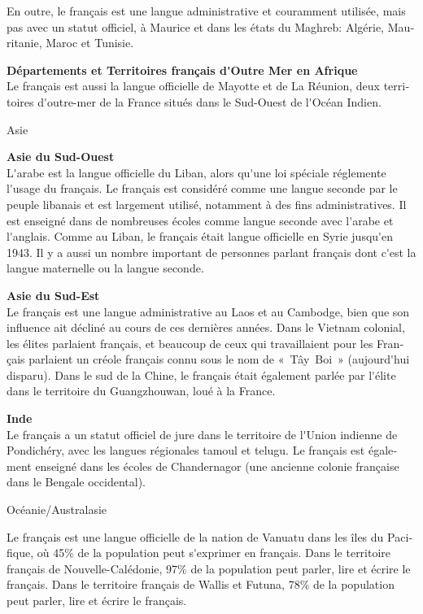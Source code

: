 \documentclass[]{../metanetpaper}
\begin{document}
\begin{french}
\begin{multicols}{2}
En outre, le français est une langue administrative et couramment
utilisée, mais pas avec un statut officiel, à Maurice et dans les
états du Maghreb: Algérie, Mauritanie, Maroc et Tunisie.

{\bf Départements et Territoires français d{\mbox '}Outre Mer en Afrique}\\
Le français est aussi la langue officielle de Mayotte et de La
Réunion, deux territoires d{\mbox '}outre-mer de la France situés dans
le Sud-Ouest de l{\mbox '}Océan Indien.

\begin{center}
{\sc Asie}
\end{center}

{\bf Asie du Sud-Ouest}\\ 
L{\mbox '}arabe est la langue officielle du Liban, alors qu{\mbox '}une 
loi spéciale réglemente l{\mbox '}usage du français. Le
français est considéré comme une langue seconde par le peuple libanais
et est largement utilisé, notamment à des fins administratives. Il est
enseigné dans de nombreuses écoles comme langue seconde avec l{\mbox
 '}arabe et l{\mbox '}anglais. Comme au Liban, le français était
langue officielle en Syrie jusqu{\mbox '}en 1943. Il y a aussi un
nombre important de personnes parlant français dont c{\mbox '}est la
langue maternelle ou la langue seconde.

{\bf Asie du Sud-Est}\\ 
Le français est une langue administrative au
Laos et au Cambodge, bien que son influence ait décliné au cours de
ces dernières années. Dans le Vietnam colonial, les élites parlaient
français, et beaucoup de ceux qui travaillaient pour les Français
parlaient un créole français connu sous le nom de «~Tây~Boi~»
(aujourd{\mbox '}hui disparu).  Dans le sud de la Chine, le français
était également parlée par l{\mbox '}élite dans le territoire du
Guangzhouwan, loué à la France.

{\bf Inde}\\
Le français a un statut officiel de jure dans le territoire de l{\mbox
 '}Union indienne de Pondichéry, avec les langues régionales tamoul
et telugu. Le français est également enseigné dans les écoles de
Chandernagor (une ancienne colonie française dans le Bengale
occidental).

\begin{center}
{\sc Océanie/Australasie}
\end{center}
Le français est une langue officielle de la nation de Vanuatu dans les
îles du Pacifique, où 45\% de la population peut s{\mbox '}exprimer en
français. Dans le territoire français de Nouvelle-Calédonie, 97\% de
la population peut parler, lire et écrire le français. Dans le
territoire français de Wallis et Futuna, 78\% de la population peut
parler, lire et écrire le français.


\end{multicols}
\end{french}
\end{document}
